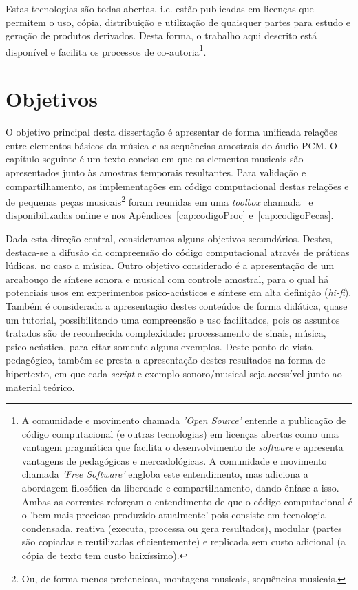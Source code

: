Estas tecnologias são todas abertas, i.e. estão publicadas em licenças que permitem o uso, cópia, distribuição e utilização de quaisquer partes para estudo e geração de produtos derivados. Desta forma, o trabalho aqui descrito está disponível e facilita os processos de co-autoria\footnote{A comunidade e movimento chamada \emph{'Open Source'} entende a publicação de código computacional (e outras tecnologias) em licenças abertas como uma vantagem pragmática que facilita o desenvolvimento de \emph{software} e apresenta vantagens de pedagógicas e mercadológicas. A comunidade e movimento chamada \emph{'Free Software'} engloba este entendimento, mas adiciona a abordagem filosófica da liberdade e compartilhamento, dando ênfase a isso. Ambas as correntes reforçam o entendimento de que o código computacional é o 'bem mais precioso produzido atualmente' pois consiste em tecnologia condensada, reativa (executa, processa ou gera resultados), modular (partes são copiadas e reutilizadas eficientemente) e replicada sem custo adicional (a cópia de texto tem custo baixíssimo).\cite{Raymond,Lessig}}.

    \section{Objetivos}
   \label{sec:objetivos}
O objetivo principal desta dissertação é apresentar de forma unificada relações entre elementos básicos da música e as sequências amostrais do áudio PCM. O capítulo seguinte é um texto conciso em que os elementos musicais são apresentados junto às amostras temporais resultantes. Para validação e compartilhamento, as implementações em código computacional destas relações e de pequenas peças musicais\footnote{Ou, de forma menos pretenciosa, montagens musicais, sequências musicais.} foram reunidas em uma \emph{toolbox} chamada \massa\ e disponibilizadas online e nos Apêndices~\ref{cap:codigoProc} e~\ref{cap:codigoPecas}. 

Dada esta direção central, consideramos alguns objetivos secundários. Destes, destaca-se a difusão da compreensão do código computacional através de práticas lúdicas, no caso a música. Outro objetivo considerado é a apresentação de um arcabouço de síntese sonora e musical com controle amostral, para o qual há potenciais usos em experimentos psico-acústicos e síntese em alta definição (\emph{hi-fi}). Também é considerada a apresentação destes conteúdos de forma didática, quase um tutorial, possibilitando uma compreensão e uso facilitados, pois os assuntos tratados são de reconhecida complexidade: processamento de sinais, música, psico-acústica, para citar somente alguns exemplos. Deste ponto de vista pedagógico, também se presta a apresentação destes resultados na forma de hipertexto, em que cada \emph{script} e exemplo sonoro/musical seja acessível junto ao material teórico.
  
